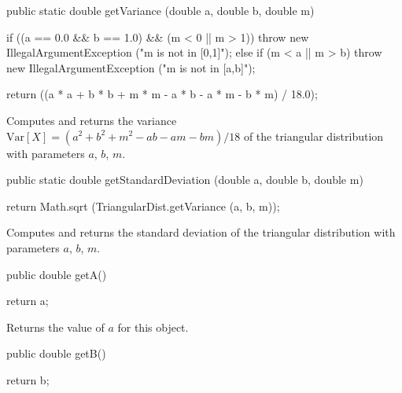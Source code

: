\begin{htmlonly}
\end{htmlonly}
\begin{code}

   public static double getVariance (double a, double b, double m)\begin{hide} {
      if ((a == 0.0 && b == 1.0) && (m < 0 || m > 1))
         throw new IllegalArgumentException ("m is not in [0,1]");
      else if (m < a || m > b) 
         throw new IllegalArgumentException ("m is not in [a,b]");

      return ((a * a + b * b + m * m - a * b - a * m - b * m) / 18.0);
   }\end{hide}
\end{code}
\begin{tabb}  Computes and returns the variance 
   $\mbox{Var}[X] = (a^2 + b^2 + m^2 - ab - am - bm)/18$
   of the triangular distribution with parameters $a$, $b$, $m$.
\end{tabb}
\begin{htmlonly}
\end{htmlonly}
\begin{code}

   public static double getStandardDeviation (double a, double b, double m)\begin{hide} {
      return Math.sqrt (TriangularDist.getVariance (a, b, m));
   }\end{hide}
\end{code}
\begin{tabb}  Computes and returns the standard deviation
   of the triangular distribution with parameters $a$, $b$, $m$.
\end{tabb}
\begin{htmlonly}
\end{htmlonly}
\begin{code}      

   public double getA()\begin{hide} {
      return a;
   }\end{hide}
\end{code}
  \begin{tabb}
  Returns the value of $a$ for this object.
 \end{tabb}
\begin{code}      

   public double getB()\begin{hide} {
      return b;
   }\end{hide}
\end{code}
